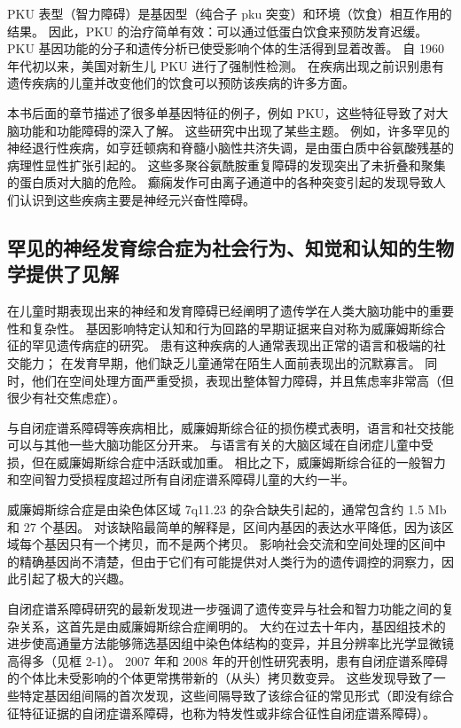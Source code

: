 PKU 表型（智力障碍）是基因型（纯合子 pku 突变）和环境（饮食）相互作用的结果。 
因此，PKU 的治疗简单有效：可以通过低蛋白饮食来预防发育迟缓。 
PKU 基因功能的分子和遗传分析已使受影响个体的生活得到显着改善。 
自 1960 年代初以来，美国对新生儿 PKU 进行了强制性检测。 
在疾病出现之前识别患有遗传疾病的儿童并改变他们的饮食可以预防该疾病的许多方面。


本书后面的章节描述了很多单基因特征的例子，例如 PKU，这些特征导致了对大脑功能和功能障碍的深入了解。 
这些研究中出现了某些主题。 
例如，许多罕见的神经退行性疾病，如亨廷顿病和脊髓小脑性共济失调，是由蛋白质中谷氨酸残基的病理性显性扩张引起的。 
这些多聚谷氨酰胺重复障碍的发现突出了未折叠和聚集的蛋白质对大脑的危险。 
癫痫发作可由离子通道中的各种突变引起的发现导致人们认识到这些疾病主要是神经元兴奋性障碍。


\subsection{罕见的神经发育综合症为社会行为、知觉和认知的生物学提供了见解}

在儿童时期表现出来的神经和发育障碍已经阐明了遗传学在人类大脑功能中的重要性和复杂性。 
基因影响特定认知和行为回路的早期证据来自对称为威廉姆斯综合征的罕见遗传病症的研究。 
患有这种疾病的人通常表现出正常的语言和极端的社交能力； 
在发育早期，他们缺乏儿童通常在陌生人面前表现出的沉默寡言。 
同时，他们在空间处理方面严重受损，表现出整体智力障碍，并且焦虑率非常高（但很少有社交焦虑症）。


与自闭症谱系障碍等疾病相比，威廉姆斯综合征的损伤模式表明，语言和社交技能可以与其他一些大脑功能区分开来。 
与语言有关的大脑区域在自闭症儿童中受损，但在威廉姆斯综合症中活跃或加重。 
相比之下，威廉姆斯综合征的一般智力和空间智力受损程度超过所有自闭症谱系障碍儿童的大约一半。


威廉姆斯综合症是由染色体区域 7q11.23 的杂合缺失引起的，通常包含约 1.5 Mb 和 27 个基因。 
对该缺陷最简单的解释是，区间内基因的表达水平降低，因为该区域每个基因只有一个拷贝，而不是两个拷贝。 
影响社会交流和空间处理的区间中的精确基因尚不清楚，但由于它们有可能提供对人类行为的遗传调控的洞察力，因此引起了极大的兴趣。


自闭症谱系障碍研究的最新发现进一步强调了遗传变异与社会和智力功能之间的复杂关系，这首先是由威廉姆斯综合症阐明的。 
大约在过去十年内，基因组技术的进步使高通量方法能够筛选基因组中染色体结构的变异，并且分辨率比光学显微镜高得多（见框 2-1）。 
2007 年和 2008 年的开创性研究表明，患有自闭症谱系障碍的个体比未受影响的个体更常携带新的（从头）拷贝数变异。 
这些发现导致了一些特定基因组间隔的首次发现，这些间隔导致了该综合征的常见形式（即没有综合征特征证据的自闭症谱系障碍，也称为特发性或非综合征性自闭症谱系障碍）。


